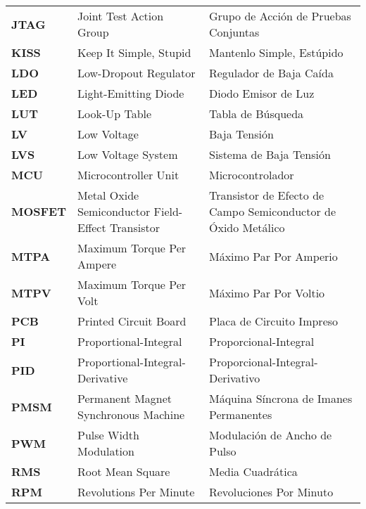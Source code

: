 \begin{longtable}{>{\bfseries}p{3cm} p{5cm} p{5cm}}
\textbf{JTAG} & Joint Test Action Group & Grupo de Acción de Pruebas Conjuntas \\

\textbf{KISS} & Keep It Simple, Stupid & Mantenlo Simple, Estúpido \\

\textbf{LDO} & Low-Dropout Regulator & Regulador de Baja Caída \\

\textbf{LED} & Light-Emitting Diode & Diodo Emisor de Luz \\

\textbf{LUT} & Look-Up Table & Tabla de Búsqueda \\

\textbf{LV} & Low Voltage & Baja Tensión \\

\textbf{LVS} & Low Voltage System & Sistema de Baja Tensión \\

\textbf{MCU} & Microcontroller Unit & Microcontrolador \\

\textbf{MOSFET} & Metal Oxide Semiconductor Field-Effect Transistor & Transistor de Efecto de Campo Semiconductor de Óxido Metálico \\

\textbf{MTPA} & Maximum Torque Per Ampere & Máximo Par Por Amperio \\

\textbf{MTPV} & Maximum Torque Per Volt & Máximo Par Por Voltio \\

\textbf{PCB} & Printed Circuit Board & Placa de Circuito Impreso \\

\textbf{PI} & Proportional-Integral & Proporcional-Integral \\

\textbf{PID} & Proportional-Integral-Derivative & Proporcional-Integral-Derivativo \\

\textbf{PMSM} & Permanent Magnet Synchronous Machine & Máquina Síncrona de Imanes Permanentes \\

\textbf{PWM} & Pulse Width Modulation & Modulación de Ancho de Pulso \\

\textbf{RMS} & Root Mean Square & Media Cuadrática \\

\textbf{RPM} & Revolutions Per Minute & Revoluciones Por Minuto \\


\end{longtable}
